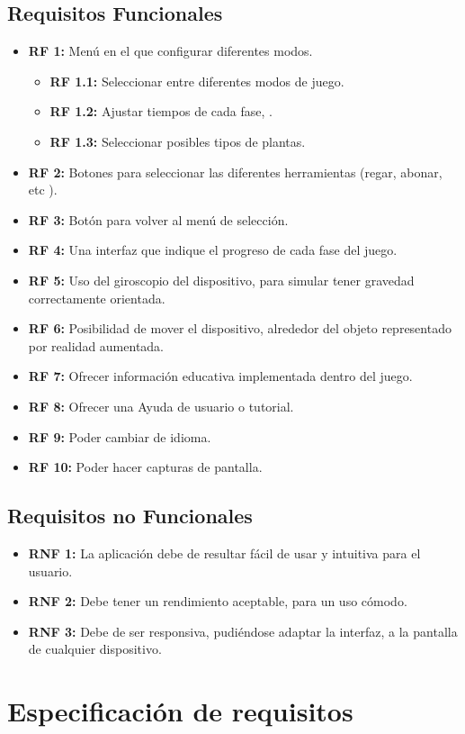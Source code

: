 \subsection{Requisitos Funcionales}
 \begin{itemize}
	\item \textbf{RF 1:} Menú en el que configurar diferentes modos.
	\begin{itemize}
	\item \textbf{RF 1.1:} Seleccionar entre diferentes modos de juego.
	\item \textbf{RF 1.2:} Ajustar tiempos de cada fase,  .
	\item \textbf{RF 1.3:} Seleccionar posibles tipos de plantas.	
	\end{itemize} 
	\item \textbf{RF 2:} Botones para seleccionar las diferentes herramientas (regar, abonar, etc ).
	\item \textbf{RF 3:} Botón para volver al menú de selección.
	\item \textbf{RF 4:} Una interfaz que indique el progreso de cada fase del juego.
	\item \textbf{RF 5:} Uso del giroscopio del dispositivo, para simular tener gravedad correctamente orientada.
	\item \textbf{RF 6:} Posibilidad de mover el dispositivo, alrededor del objeto representado por realidad aumentada.
	\item \textbf{RF 7:} Ofrecer información educativa implementada dentro del juego.
	\item \textbf{RF 8:} Ofrecer una Ayuda de usuario o tutorial.
	\item \textbf{RF 9:} Poder cambiar de idioma.
	\item \textbf{RF 10:} Poder hacer capturas de pantalla.
\end{itemize}
\subsection{Requisitos no Funcionales}
\begin{itemize}
	\item \textbf{RNF 1:} La aplicación debe de resultar fácil de usar y intuitiva para el usuario.
	\item \textbf{RNF 2:} Debe tener un rendimiento aceptable, para un uso cómodo.
	\item \textbf{RNF 3:} Debe de ser responsiva, pudiéndose adaptar la interfaz, a la pantalla de cualquier dispositivo.
\end{itemize}
\section{Especificación de requisitos}


